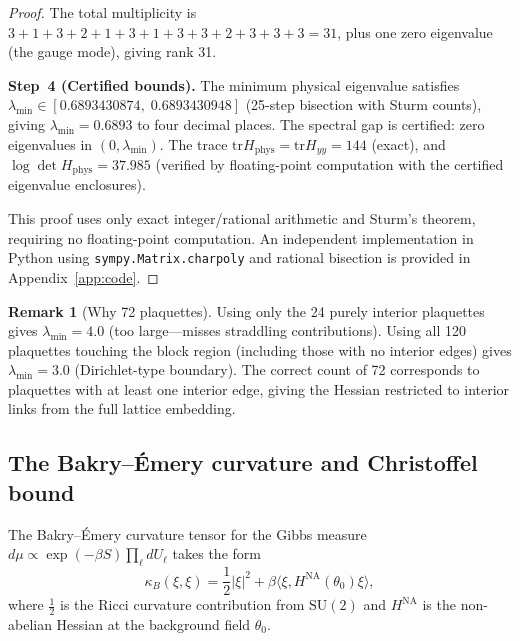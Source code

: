 \documentclass[11pt]{article}
\theoremstyle{definition}
\newtheorem{remark}[theorem]{Remark}
\newcommand{\SU}{\mathrm{SU}}
\newcommand{\tr}{\mathrm{tr}}
\begin{document}
\begin{proof}
\noindent The total multiplicity is $3+1+3+2+1+3+1+3+3+2+3+3+3=31$,
plus one zero eigenvalue (the gauge mode), giving rank 31.

\medskip\noindent\textbf{Step~4 (Certified bounds).}
The minimum physical eigenvalue satisfies $\lambda_{\min}\in
[0.6893430874,\;0.6893430948]$ (25-step bisection with Sturm counts),
giving $\lambda_{\min}=0.6893$ to four decimal
places.  The spectral gap is certified: zero eigenvalues in
$(0,\lambda_{\min})$.  The trace $\tr H_{\mathrm{phys}}=\tr H_{yy}=144$
(exact), and $\log\det H_{\mathrm{phys}}=37.985$ (verified by
floating-point computation with the certified eigenvalue enclosures).

\medskip
This proof uses only exact integer/rational arithmetic and Sturm's
theorem, requiring no floating-point computation.  An independent
implementation in Python using \texttt{sympy.Matrix.charpoly} and
rational bisection is provided in Appendix~\ref{app:code}.
\end{proof}

\begin{remark}[Why 72 plaquettes]
Using only the 24 purely interior plaquettes gives $\lambda_{\min}=4.0$
(too large---misses straddling contributions).  Using all 120 plaquettes
touching the block region (including those with no interior edges) gives
$\lambda_{\min}=3.0$ (Dirichlet-type boundary).  The correct count of 72
corresponds to plaquettes with at least one interior edge, giving the
Hessian restricted to interior links from the full lattice embedding.
\end{remark}

\subsection{The Bakry--\'Emery curvature and Christoffel bound}
\label{subsec:antisym}

The Bakry--\'Emery curvature tensor for the Gibbs measure
$d\mu\propto\exp(-\beta S)\prod_\ell dU_\ell$ takes the form
\begin{equation}\label{eq:BE}
\kappa_B(\xi,\xi)
=\frac{1}{2}|\xi|^2+\beta\bigl\langle\xi,
H^{\mathrm{NA}}(\theta_0)\xi\bigr\rangle,
\end{equation}
where $\frac{1}{2}$ is the Ricci curvature contribution from $\SU(2)$
and $H^{\mathrm{NA}}$ is the non-abelian
Hessian at the background field $\theta_0$.
\end{document}
